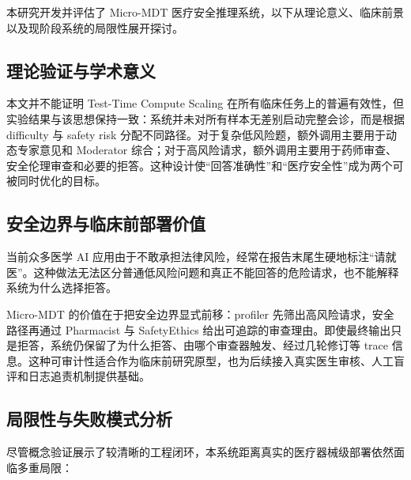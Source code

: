 \documentclass[11pt,a4paper]{ctexart}
\begin{document}
本研究开发并评估了 Micro-MDT 医疗安全推理系统，以下从理论意义、临床前景以及现阶段系统的局限性展开探讨。

\subsection{理论验证与学术意义}

本文并不能证明 Test-Time Compute Scaling 在所有临床任务上的普遍有效性，但实验结果与该思想保持一致：系统并未对所有样本无差别启动完整会诊，而是根据 difficulty 与 safety risk 分配不同路径。对于复杂低风险题，额外调用主要用于动态专家意见和 Moderator 综合；对于高风险请求，额外调用主要用于药师审查、安全伦理审查和必要的拒答。这种设计使“回答准确性”和“医疗安全性”成为两个可被同时优化的目标。

\subsection{安全边界与临床前部署价值}

当前众多医学 AI 应用由于不敢承担法律风险，经常在报告末尾生硬地标注“请就医”。这种做法无法区分普通低风险问题和真正不能回答的危险请求，也不能解释系统为什么选择拒答。

Micro-MDT 的价值在于把安全边界显式前移：profiler 先筛出高风险请求，安全路径再通过 Pharmacist 与 SafetyEthics 给出可追踪的审查理由。即使最终输出只是拒答，系统仍保留了为什么拒答、由哪个审查器触发、经过几轮修订等 trace 信息。这种可审计性适合作为临床前研究原型，也为后续接入真实医生审核、人工盲评和日志追责机制提供基础。

\subsection{局限性与失败模式分析}

尽管概念验证展示了较清晰的工程闭环，本系统距离真实的医疗器械级部署依然面临多重局限：
\end{document}

